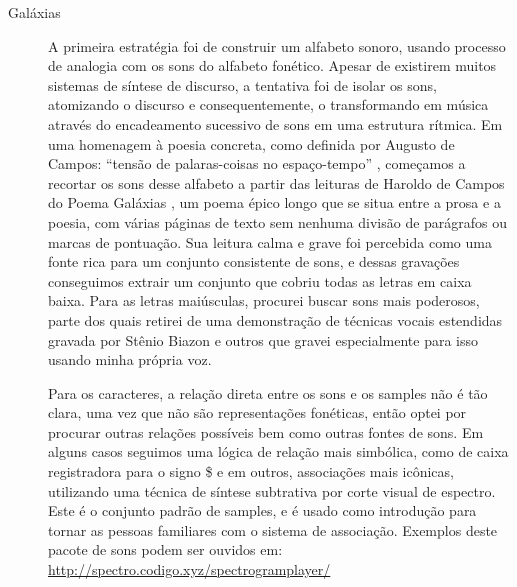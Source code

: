 \begin{description}
 \item[Galáxias] A primeira estratégia foi de construir um alfabeto sonoro, usando processo de analogia com os sons do alfabeto fonético. Apesar de existirem muitos sistemas de síntese de discurso, a tentativa foi de isolar os sons, atomizando o discurso e consequentemente, o transformando em música através do encadeamento sucessivo de sons em uma estrutura rítmica. 
Em uma homenagem à poesia concreta, como definida por Augusto de Campos: ``tensão de palaras-coisas no espaço-tempo'' \cite[45]{campos_teoria_2014}, começamos a recortar os sons desse alfabeto a partir das leituras de Haroldo de Campos do Poema Galáxias \cite{Campos2004}, um poema épico longo que se situa entre a prosa e a poesia, com várias páginas de texto sem nenhuma divisão de parágrafos ou marcas de pontuação. Sua leitura calma e grave foi percebida como uma fonte rica para um conjunto consistente de sons, e dessas gravações conseguimos extrair um conjunto que cobriu todas as letras em caixa baixa. Para as letras maiúsculas, procurei buscar sons mais poderosos, parte dos quais retirei de uma demonstração de técnicas vocais estendidas gravada por Stênio Biazon e outros que gravei especialmente para isso usando minha própria voz.  

Para os caracteres, a relação direta entre os sons e os samples não é tão clara, uma vez que não são representações fonéticas, então optei por procurar outras relações possíveis bem como outras fontes de sons. Em alguns casos seguimos uma lógica de relação mais simbólica, como de caixa registradora para o signo \$ e em outros, associações mais icônicas, utilizando uma técnica de síntese subtrativa por corte visual de espectro. Este é o conjunto padrão de samples, e é usado como introdução para tornar as pessoas familiares com o sistema de associação. Exemplos deste pacote de sons podem ser ouvidos em: \url{http://spectro.codigo.xyz/spectrogramplayer/}


\end{description}
